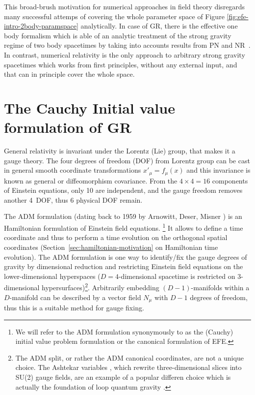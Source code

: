 This broad-brush motivation for numerical approaches in field theory disregards
many successful attemps of covering the whole parameter space of Figure \ref{fig:efe-intro-2body-paramspace}
analytically. In case of GR, there is the effective one body formalism which is able of
an analytic treatment of the strong gravity regime of two body spacetimes by taking into
accounts results from PN and NR~\cite{Damour:2008yg,Buonanno:1998gg}. In contrast, numerical
relativity is the only approach to arbitrary strong gravity spacetimes which works from
first principles, \ie without any external input, and that can in principle cover the whole
space.

\section{The Cauchy Initial value formulation of GR}%
\label{sec:adm}%
%
General relativity is invariant under the Lorentz (Lie) group, that makes it a gauge
theory. The four degrees of freedom (DOF) from Lorentz group can be cast in 
general smooth coordinate transformations $x'_\mu = f_\mu(x)$ and this 
invariance is known as general or diffeomorphism covariance. From the
$4\times4=16$ components of Einstein equations, only 10 are independent, and
the gauge freedom removes another 4~DOF, thus 6 
physical DOF remain.

The ADM formulation (dating back to 1959 by Arnowitt, Deser, Misner
\cite{Arnowitt62}) is an Hamiltonian formulation of Einstein
field equations.
\footnote{
  We will refer to the ADM formulation synonymously to as the (Cauchy)
  initial value problem	formulation or the canonical formulation of EFE.
} It allows to define a time coordinate and thus to perform
a time evolution on the orthogonal spatial coordinates 
(\cf Section~\ref{sec:hamiltonian-motivation} on
Hamiltonian time evolution).
The ADM formulation is one way to identify/fix the gauge degrees of gravity
by dimensional reduction and restricting Einstein field equations on the
lower-dimensional hyperspaces (\eg $D=4$-dimensional spacetime is restricted on
3-dimensional hypersurfaces)\footnote{
	The ADM split, or rather the ADM canonical coordinates, are not a unique choice.
	The Ashtekar variables \cite{Ashtekar1986}, which rewrite three-dimensional slices into
	SU(2) gauge fields, are an example of a popular differen choice which is actually
	the foundation of loop quantum gravity \cite{Rovelli2008}.
}. Arbitrarily embedding $(D-1)$-mani\-folds within
a $D$-manifold can be described by a vector field $N_\mu$ with $D-1$ degrees of
freedom, thus this is a suitable method for gauge fixing.


